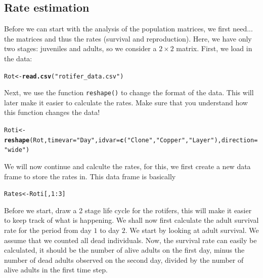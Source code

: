 \documentclass{article}\usepackage[]{graphicx}\usepackage[]{color}
\makeatletter
\newcommand{\hlnum}[1]{\textcolor[rgb]{0.686,0.059,0.569}{#1}}%
\newcommand{\hlstr}[1]{\textcolor[rgb]{0.192,0.494,0.8}{#1}}%
\newcommand{\hlopt}[1]{\textcolor[rgb]{0,0,0}{#1}}%
\newcommand{\hlstd}[1]{\textcolor[rgb]{0.345,0.345,0.345}{#1}}%
\newcommand{\hlkwb}[1]{\textcolor[rgb]{0.69,0.353,0.396}{#1}}%
\newcommand{\hlkwc}[1]{\textcolor[rgb]{0.333,0.667,0.333}{#1}}%
\newcommand{\hlkwd}[1]{\textcolor[rgb]{0.737,0.353,0.396}{\textbf{#1}}}%
\newenvironment{kframe}{%
 \def\at@end@of@kframe{}%
 \ifinner\ifhmode%
  \def\at@end@of@kframe{\end{minipage}}%
  \begin{minipage}{\columnwidth}%
 \fi\fi%
 \def\FrameCommand##1{\hskip\@totalleftmargin \hskip-\fboxsep
 \colorbox{shadecolor}{##1}\hskip-\fboxsep
     \hskip-\linewidth \hskip-\@totalleftmargin \hskip\columnwidth}%
 \MakeFramed {\advance\hsize-\width
   \@totalleftmargin\z@ \linewidth\hsize
   \@setminipage}}%
 {\par\unskip\endMakeFramed%
 \at@end@of@kframe}
\newenvironment{knitrout}{}{} %
\makeatother
\begin{document}
\subsection{Rate estimation}
Before we can start with the analysis of the population matrices, we first need... the matrices and thus the rates (survival and reproduction). Here, we have only two stages: juveniles and adults, so we consider a $2\times 2$ matrix. First, we load in the data:
\begin{knitrout}
\color{fgcolor}\begin{kframe}
\begin{alltt}
\hlstd{Rot} \hlkwb{<-} \hlkwd{read.csv}\hlstd{(}\hlstr{"rotifer_data.csv"}\hlstd{)}
\end{alltt}
\end{kframe}
\end{knitrout}
Next, we use the function \texttt{reshape()} to change the format of the data. This will later make it easier to calculate the rates. Make sure that you understand how this function changes the data!
\begin{knitrout}
\color{fgcolor}\begin{kframe}
\begin{alltt}
\hlstd{Roti}\hlkwb{<-}\hlkwd{reshape}\hlstd{(Rot,}\hlkwc{timevar}\hlstd{=}\hlstr{"Day"}\hlstd{,}\hlkwc{idvar}\hlstd{=}\hlkwd{c}\hlstd{(}\hlstr{"Clone"}\hlstd{,}\hlstr{"Copper"}\hlstd{,}\hlstr{"Layer"}\hlstd{),}\hlkwc{direction}\hlstd{=}\hlstr{"wide"}\hlstd{)}
\end{alltt}
\end{kframe}
\end{knitrout}
We will now continue and calculte the rates, for this, we first create a new data frame to store the rates in. This data frame is basically 
\begin{knitrout}
\color{fgcolor}\begin{kframe}
\begin{alltt}
\hlstd{Rates} \hlkwb{<-} \hlstd{Roti[,}\hlnum{1}\hlopt{:}\hlnum{3}\hlstd{]}
\end{alltt}
\end{kframe}
\end{knitrout}
Before we start, draw a 2 stage life cycle for the rotifers, this will make it easier to keep track of what is happening. We shall now first calculate the adult survival rate for the period from day $1$ to day $2$. We start by looking at adult survival. We assume that we counted all dead individuals. Now, the survival rate can easily be calculated, it should be the number of alive adults on the first day, minus the number of dead adults observed on the second day, divided by the number of alive adults in the first time step.
\end{document}
